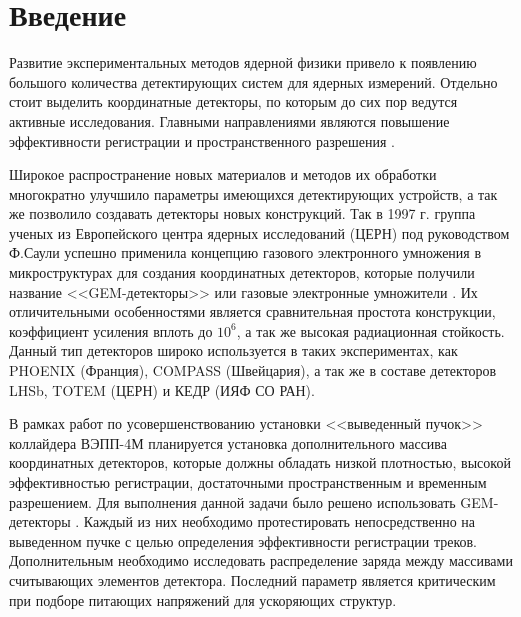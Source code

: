 \section{Введение}
\label{sec:intro}
Развитие экспериментальных методов ядерной физики привело к появлению большого количества детектирующих систем для ядерных измерений. Отдельно стоит выделить координатные детекторы, по которым до сих пор ведутся активные исследования. Главными направлениями являются повышение эффективности регистрации и пространственного разрешения  \cite{shechtman}.\par
Широкое распространение новых материалов и методов их обработки многократно улучшило параметры имеющихся детектирующих устройств, а так же позволило создавать детекторы новых конструкций. Так в 1997 г. группа ученых из Европейского центра ядерных исследований (ЦЕРН) под руководством Ф.Саули успешно применила концепцию газового электронного умножения в микроструктурах для создания координатных детекторов, которые получили название <<GEM-детекторы>> или газовые электронные умножители \cite{sauli}. Их отличительными особенностями является сравнительная простота конструкции, коэффициент усиления вплоть до $10^6$, а так же высокая радиационная стойкость. Данный тип детекторов широко используется в таких экспериментах, как PHOENIX (Франция), COMPASS (Швейцария), а так же в составе детекторов LHSb, TOTEM (ЦЕРН) и КЕДР (ИЯФ СО РАН).\par
В рамках работ по усовершенствованию установки <<выведенный пучок>> коллайдера ВЭПП-4М  планируется установка дополнительного массива координатных детекторов, которые должны обладать низкой плотностью, высокой эффективностью регистрации, достаточными пространственным и временным разрешением. Для выполнения данной задачи было решено использовать GEM-детекторы \cite{Bobr}. Каждый из них необходимо протестировать непосредственно на выведенном пучке с целью определения эффективности регистрации треков. Дополнительным необходимо исследовать распределение заряда между массивами считывающих элементов детектора. Последний параметр является критическим при подборе питающих напряжений для ускоряющих структур.\par